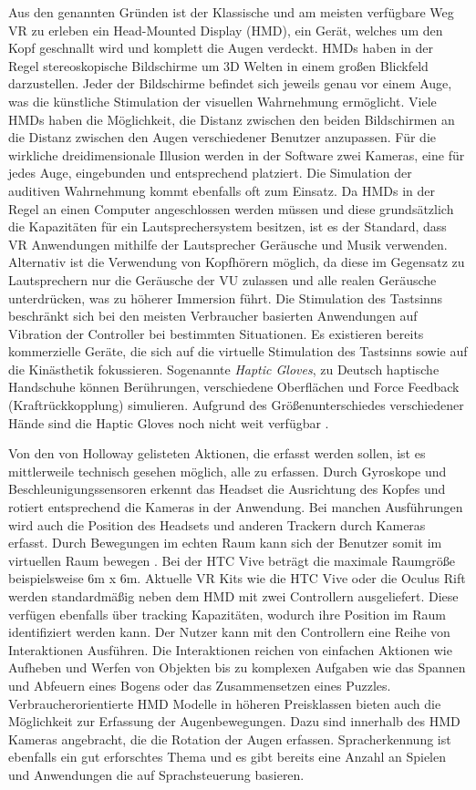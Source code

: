 Aus den genannten Gründen ist der Klassische und am meisten verfügbare Weg VR zu erleben ein Head-Mounted Display (HMD), ein Gerät, welches um den Kopf geschnallt wird und komplett die Augen verdeckt. HMDs haben in der Regel stereoskopische Bildschirme um 3D Welten in einem großen Blickfeld darzustellen. Jeder der Bildschirme befindet sich jeweils genau vor einem Auge, was die künstliche Stimulation der visuellen Wahrnehmung ermöglicht. Viele HMDs haben die Möglichkeit, die Distanz zwischen den beiden Bildschirmen an die Distanz zwischen den Augen verschiedener Benutzer anzupassen. Für die wirkliche dreidimensionale Illusion werden in der Software zwei Kameras, eine für jedes Auge, eingebunden und entsprechend platziert.
Die Simulation der auditiven Wahrnehmung kommt ebenfalls oft zum Einsatz. Da HMDs in der Regel an einen Computer angeschlossen werden müssen und diese grundsätzlich die Kapazitäten für ein Lautsprechersystem besitzen, ist es der Standard, dass VR Anwendungen mithilfe der Lautsprecher Geräusche und Musik verwenden. Alternativ ist die Verwendung von Kopfhörern möglich, da diese im Gegensatz zu Lautsprechern nur die Geräusche der VU zulassen und alle realen Geräusche unterdrücken, was zu höherer Immersion führt. Die Stimulation des Tastsinns beschränkt sich bei den meisten Verbraucher basierten Anwendungen auf Vibration der Controller bei bestimmten Situationen. Es existieren bereits kommerzielle Geräte, die sich auf die virtuelle Stimulation des Tastsinns sowie auf die Kinästhetik fokussieren. Sogenannte \textit{Haptic Gloves}, zu Deutsch haptische Handschuhe können Berührungen, verschiedene Oberflächen und Force Feedback (Kraftrückkopplung) simulieren. Aufgrund des Größenunterschiedes verschiedener Hände sind die Haptic Gloves noch nicht weit verfügbar \cite{Perret2018}.

Von den von Holloway \cite{Holloway1995} gelisteten Aktionen, die erfasst werden sollen, ist es mittlerweile technisch gesehen möglich, alle zu erfassen.
Durch Gyroskope und Beschleunigungssensoren erkennt das Headset die Ausrichtung des Kopfes und rotiert entsprechend die Kameras in der Anwendung. Bei manchen Ausführungen wird auch die Position des Headsets und anderen Trackern durch Kameras erfasst. Durch Bewegungen im echten Raum kann sich der Benutzer somit im virtuellen Raum bewegen \cite{Boas2012}\cite{Holloway1995}. Bei der HTC Vive beträgt die maximale Raumgröße beispielsweise 6m x 6m.
Aktuelle VR Kits wie die HTC Vive oder die Oculus Rift werden standardmäßig neben dem HMD mit zwei Controllern ausgeliefert. Diese verfügen ebenfalls über tracking Kapazitäten, wodurch ihre Position im Raum identifiziert werden kann. Der Nutzer kann mit den Controllern eine Reihe von Interaktionen Ausführen. Die Interaktionen reichen von einfachen Aktionen wie Aufheben und Werfen von Objekten bis zu komplexen Aufgaben wie das Spannen und Abfeuern eines Bogens oder das Zusammensetzen eines Puzzles. Verbraucherorientierte HMD Modelle in höheren Preisklassen bieten auch die Möglichkeit zur Erfassung der Augenbewegungen. Dazu sind innerhalb des HMD Kameras angebracht, die die Rotation der Augen erfassen. Spracherkennung ist ebenfalls ein gut erforschtes Thema und es gibt bereits eine Anzahl an Spielen und Anwendungen die auf Sprachsteuerung basieren. \cite{Lamberti2017} 

